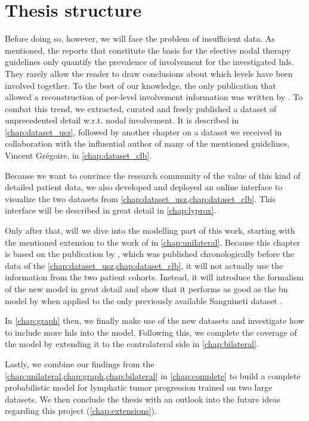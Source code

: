 \documentclass[\relativeRoot/main.tex]{subfiles}
\begin{document}
\section{Thesis structure}
\label{sec:intro:structure}

Before doing so, however, we will face the problem of insufficient data. As mentioned, the reports that constitute the basis for the elective nodal therapy guidelines only quantify the prevalence of involvement for the investigated \glspl{lnl}. They rarely allow the reader to draw conclusions about which levels have been involved together. To the best of our knowledge, the only publication that allowed a reconstruction of per-level involvement information was written by . To combat this trend, we extracted, curated and freely published a dataset of unprecedented detail w.r.t. nodal involvement. It is described in \cref{chap:dataset_usz}, followed by another chapter on a dataset we received in collaboration with the influential author of many of the mentioned guidelines, Vincent Grégoire, in \cref{chap:dataset_clb}.

Because we want to convince the research community of the value of this kind of detailed patient data, we also developed and deployed an online interface to visualize the two datasets from \cref{chap:dataset_usz,chap:dataset_clb}. This interface will be described in great detail in \cref{chap:lyprox}.

Only after that, will we dive into the modelling part of this work, starting with the mentioned extension to the work of  in \cref{chap:unilateral}. Because this chapter is based on the publication by , which was published chronologically before the data of the \cref{chap:dataset_usz,chap:dataset_clb}, it will not actually use the information from the two patient cohorts. Instead, it will introduce the formalism of the new model in great detail and show that it performs as good as the \gls{bn} model by  when applied to the only previously available Sanguineti dataset \cite{sanguineti_defining_2009}.

In \cref{chap:graph} then, we finally make use of the new datasets and investigate how to include more \glspl{lnl} into the model. Following this, we complete the coverage of the model by extending it to the contralateral side in \cref{chap:bilateral}.

Lastly, we combine our findings from the \cref{chap:unilateral,chap:graph,chap:bilateral} in \cref{chap:complete} to build a complete probabilistic model for lymphatic tumor progression trained on two large datasets. We then conclude the thesis with an outlook into the future ideas regarding this project (\cref{chap:extensions}).
\end{document}
